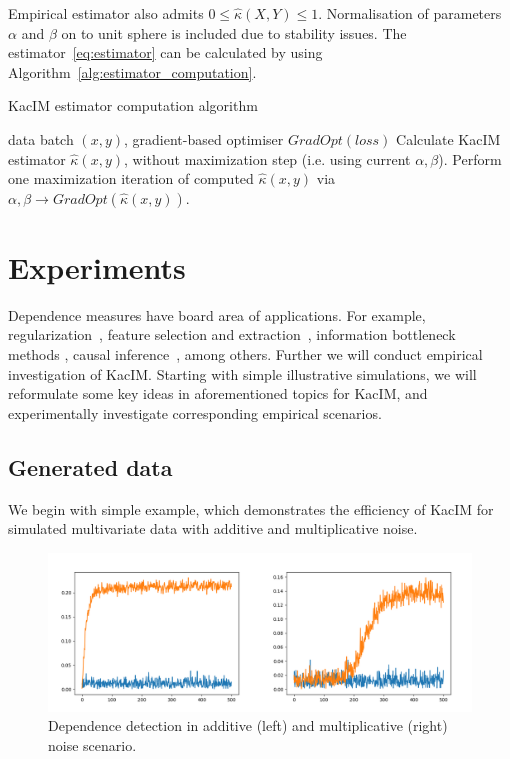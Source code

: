 \documentclass{article}
\begin{document}
\noindent Empirical estimator also admits $0 \leq \hat{\kappa}(X,Y) \leq 1$. Normalisation of parameters $\alpha$ and $\beta$ on to unit sphere is included due to stability issues. The  estimator~\eqref{eq:estimator} can be calculated by using Algorithm~\ref{alg:estimator_computation}.

\begin{algorithm}
\caption{KacIM estimator computation algorithm}\label{alg:estimator_computation}
\begin{algorithmic}
\Require data batch $(x,y)$, gradient-based optimiser $GradOpt(loss)$
\State Calculate KacIM estimator $\hat{\kappa}(x,y)$, without maximization step (i.e. using current $\alpha, \beta$).
\State Perform one maximization iteration of computed $\hat{\kappa}(x,y)$ via $\alpha, \beta \rightarrow GradOpt(\hat{\kappa}(x,y))$.
\end{algorithmic}
\end{algorithm}

\section{Experiments}
\label{section:experiments}
Dependence measures have board area of applications. For example, regularization~\cite{?,?}, feature selection and extraction~\cite{?}, information bottleneck methods \cite{?}, causal inference~\cite{?}, among others. Further we will conduct empirical investigation of KacIM. Starting with simple illustrative simulations, we will reformulate some key ideas in aforementioned topics for KacIM, and experimentally investigate corresponding empirical scenarios.


\subsection{Generated data}

We begin with simple example, which demonstrates the efficiency of KacIM for simulated multivariate data with additive and multiplicative noise.

\begin{figure}[t]
\label{fig:experiments_simulation}
\centering
\includegraphics[scale=0.25]{./out.png}
\caption{Dependence detection in additive (left) and multiplicative (right) noise scenario.}
\end{figure}
\end{document}
